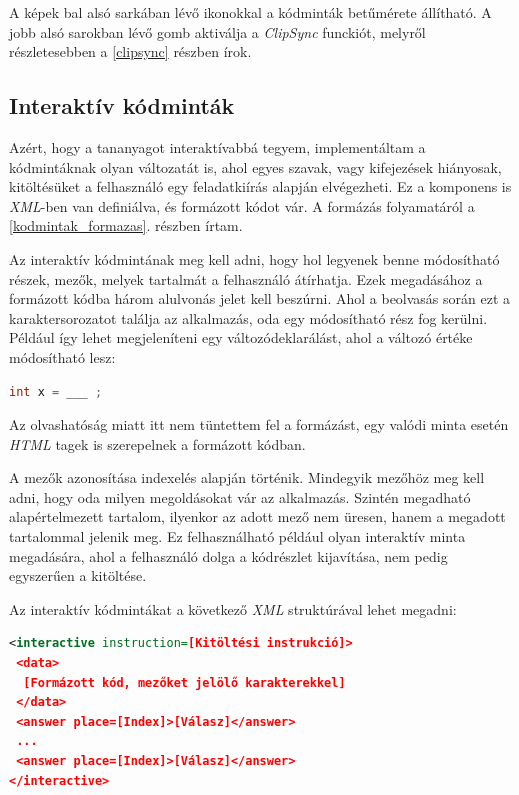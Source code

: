 \documentclass[12pt,a4paper]{article}
\newcommand{\xml}{\textit{XML}\xspace}
\begin{document}
	A képek bal alsó sarkában lévő ikonokkal a kódminták betűmérete állítható. A jobb alsó sarokban lévő gomb aktiválja a \textit{ClipSync} funckiót, melyről részletesebben a \ref{clipsync} részben írok.
	
	\subsection{Interaktív kódminták}
	
	Azért, hogy a tananyagot interaktívabbá tegyem, implementáltam a kódmintáknak olyan változatát is, ahol egyes szavak, vagy kifejezések hiányosak, kitöltésüket a felhasználó egy feladatkiírás alapján elvégezheti. Ez a komponens is \xml-ben van definiálva, és formázott kódot vár. A formázás folyamatáról a \ref{kodmintak_formazas}. részben írtam.
	
	Az interaktív kódmintának meg kell adni, hogy hol legyenek benne módosítható részek, mezők, melyek tartalmát a felhasználó átírhatja. Ezek megadásához a formázott kódba három alulvonás jelet kell beszúrni. Ahol a beolvasás során ezt a karaktersorozatot találja az alkalmazás, oda egy módosítható rész fog kerülni. Például így lehet megjeleníteni egy változódeklarálást, ahol a változó értéke módosítható lesz:
	
	\bigskip
	\begin{lstlisting}[language=Java]
int x = ___ ;
	\end{lstlisting}  
	\bigskip
	
	Az olvashatóság miatt itt nem tüntettem fel a formázást, egy valódi minta esetén \textit{HTML} tagek is szerepelnek a formázott kódban.
	
	A mezők azonosítása indexelés alapján történik. Mindegyik mezőhöz meg kell adni, hogy oda milyen megoldásokat vár az alkalmazás. Szintén megadható alapértelmezett tartalom, ilyenkor az adott mező nem üresen, hanem a megadott tartalommal jelenik meg. Ez felhasználható például olyan interaktív minta megadására, ahol a felhasználó dolga a kódrészlet kijavítása, nem pedig egyszerűen a kitöltése.
	
	Az interaktív kódmintákat a következő \xml struktúrával lehet megadni:
	
	\bigskip
	\begin{lstlisting}[language=XML]
<interactive instruction=[Kitöltési instrukció]>
 <data>
  [Formázott kód, mezőket jelölő karakterekkel]
 </data>
 <answer place=[Index]>[Válasz]</answer>
 ...
 <answer place=[Index]>[Válasz]</answer>
</interactive>
	\end{lstlisting}
	\bigskip
	
\end{document}
